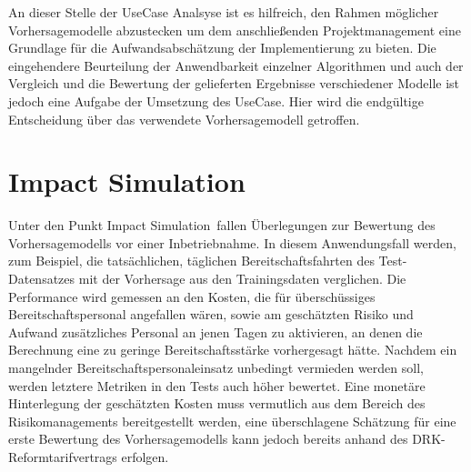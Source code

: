 An dieser Stelle der UseCase Analsyse ist es hilfreich, den Rahmen möglicher Vorhersagemodelle abzustecken um dem anschließenden Projektmanagement eine Grundlage für die Aufwandsabschätzung der Implementierung zu bieten. Die eingehendere Beurteilung der Anwendbarkeit einzelner Algorithmen und auch der Vergleich und die Bewertung der gelieferten Ergebnisse verschiedener Modelle ist jedoch eine Aufgabe der Umsetzung des UseCase. Hier wird die endgültige Entscheidung über das verwendete Vorhersagemodell getroffen. 


\section{Impact Simulation}
\label{simulation}
Unter den Punkt \glqq Impact Simulation\grqq\ fallen Überlegungen zur Bewertung des Vorhersagemodells vor einer Inbetriebnahme. In diesem Anwendungsfall werden, zum Beispiel, die tatsächlichen, täglichen Bereitschaftsfahrten des Test-Datensatzes mit der Vorhersage aus den Trainingsdaten verglichen. Die Performance wird gemessen an den Kosten, die für überschüssiges Bereitschaftspersonal angefallen wären, sowie am geschätzten Risiko und Aufwand zusätzliches Personal an jenen Tagen zu aktivieren, an denen die Berechnung eine zu geringe Bereitschaftsstärke vorhergesagt hätte. Nachdem ein mangelnder Bereitschaftspersonaleinsatz unbedingt vermieden werden soll, werden letztere Metriken in den Tests auch höher bewertet. Eine monetäre Hinterlegung der geschätzten Kosten muss vermutlich aus dem Bereich des Risikomanagements bereitgestellt werden, eine überschlagene Schätzung für eine erste Bewertung des Vorhersagemodells kann jedoch bereits anhand des DRK-Reformtarifvertrags erfolgen.

